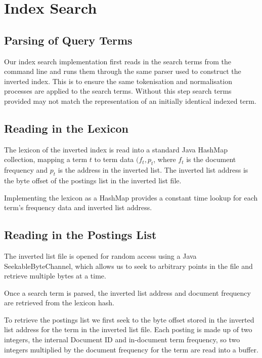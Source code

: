 
\section{Index Search}
\label{sec:querying}

\subsection*{Parsing of Query Terms}

Our index search implementation first reads in the search terms from the command line and runs them through the same parser used to construct the inverted index. This is to ensure the same tokenisation and normalisation processes are applied to the search terms. Without this step search terms provided may not match the representation of an initially identical indexed term.

\subsection*{Reading in the Lexicon}

The lexicon of the inverted index is read into a standard Java HashMap collection, mapping a term $t$ to term data $(f_t, p_t$, where $f_t$ is the document frequency and $p_t$ is the address in the inverted list. The inverted list address is the byte offset of the postings list in the inverted list file.

Implementing the lexicon as a HashMap provides a constant time lookup for each term's frequency data and inverted list address.

\subsection*{Reading in the Postings List}

The inverted list file is opened for random access using a Java SeekableByteChannel, which allows us to seek to arbitrary points in the file and retrieve multiple bytes at a time.

Once a search term is parsed, the inverted list address and document frequency are retrieved from the lexicon hash.

To retrieve the postings list we first seek to the byte offset stored in the inverted list address for the term in the inverted list file. Each posting is made up of two integers, the internal Document ID and in-document term frequency, so two integers multiplied by the document frequency for the term are read into a buffer.

